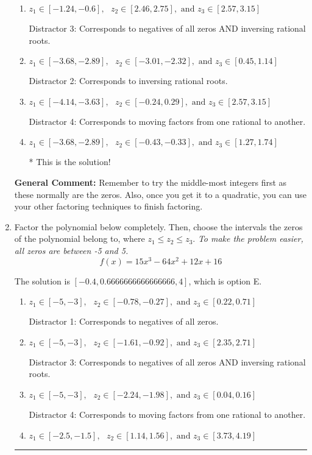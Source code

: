 \documentclass{extbook}[14pt]
\newcommand{\litem}[1]{\item #1

\rule{\textwidth}{0.4pt}}
\begin{document}
\begin{enumerate}
{\begin{enumerate}[label=\Alph*.]
 Distractor 1: Corresponds to negatives of all zeros.
\item \( z_1 \in [-1.24, -0.6], \text{   }  z_2 \in [2.46, 2.75], \text{   and   } z_3 \in [2.57, 3.15] \)

 Distractor 3: Corresponds to negatives of all zeros AND inversing rational roots.
\item \( z_1 \in [-3.68, -2.89], \text{   }  z_2 \in [-3.01, -2.32], \text{   and   } z_3 \in [0.45, 1.14] \)

 Distractor 2: Corresponds to inversing rational roots.
\item \( z_1 \in [-4.14, -3.63], \text{   }  z_2 \in [-0.24, 0.29], \text{   and   } z_3 \in [2.57, 3.15] \)

 Distractor 4: Corresponds to moving factors from one rational to another.
\item \( z_1 \in [-3.68, -2.89], \text{   }  z_2 \in [-0.43, -0.33], \text{   and   } z_3 \in [1.27, 1.74] \)

* This is the solution!
\end{enumerate}

\textbf{General Comment:} Remember to try the middle-most integers first as these normally are the zeros. Also, once you get it to a quadratic, you can use your other factoring techniques to finish factoring.
}
\litem{
Factor the polynomial below completely. Then, choose the intervals the zeros of the polynomial belong to, where $z_1 \leq z_2 \leq z_3$. \textit{To make the problem easier, all zeros are between -5 and 5.}
\[ f(x) = 15x^{3} -64 x^{2} +12 x + 16 \]

The solution is \( [-0.4, 0.6666666666666666, 4] \), which is option E.\begin{enumerate}[label=\Alph*.]
\item \( z_1 \in [-5, -3], \text{   }  z_2 \in [-0.78, -0.27], \text{   and   } z_3 \in [0.22, 0.71] \)

 Distractor 1: Corresponds to negatives of all zeros.
\item \( z_1 \in [-5, -3], \text{   }  z_2 \in [-1.61, -0.92], \text{   and   } z_3 \in [2.35, 2.71] \)

 Distractor 3: Corresponds to negatives of all zeros AND inversing rational roots.
\item \( z_1 \in [-5, -3], \text{   }  z_2 \in [-2.24, -1.98], \text{   and   } z_3 \in [0.04, 0.16] \)

 Distractor 4: Corresponds to moving factors from one rational to another.
\item \( z_1 \in [-2.5, -1.5], \text{   }  z_2 \in [1.14, 1.56], \text{   and   } z_3 \in [3.73, 4.19] \)


\end{enumerate}}
\end{enumerate}
\end{document}
